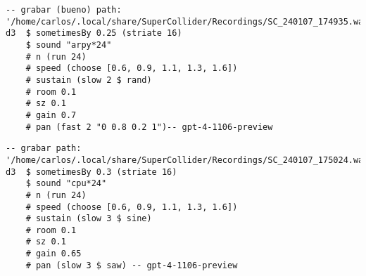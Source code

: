 \begin{minipage}[t]{1\textwidth}
    \centering
    \begin{lstlisting}[style=SuperCollider-IDE, language=ExtendedHaskell, basicstyle=\footnotesize\ttfamily, numbers=none]
-- grabar (bueno) path: '/home/carlos/.local/share/SuperCollider/Recordings/SC_240107_174935.wav'
d3  $ sometimesBy 0.25 (striate 16) 
    $ sound "arpy*24" 
    # n (run 24) 
    # speed (choose [0.6, 0.9, 1.1, 1.3, 1.6]) 
    # sustain (slow 2 $ rand) 
    # room 0.1 
    # sz 0.1 
    # gain 0.7 
    # pan (fast 2 "0 0.8 0.2 1")-- gpt-4-1106-preview                                
    \end{lstlisting}
    \vspace{1cm}
\end{minipage}










\begin{minipage}[t]{1\textwidth}
    \centering
    \begin{lstlisting}[style=SuperCollider-IDE, language=ExtendedHaskell, basicstyle=\footnotesize\ttfamily, numbers=none]
-- grabar path: '/home/carlos/.local/share/SuperCollider/Recordings/SC_240107_175024.wav'
d3  $ sometimesBy 0.3 (striate 16) 
    $ sound "cpu*24" 
    # n (run 24) 
    # speed (choose [0.6, 0.9, 1.1, 1.3, 1.6]) 
    # sustain (slow 3 $ sine) 
    # room 0.1 
    # sz 0.1 
    # gain 0.65 
    # pan (slow 3 $ saw) -- gpt-4-1106-preview                          
    \end{lstlisting}
    \vspace{1cm}
\end{minipage}











